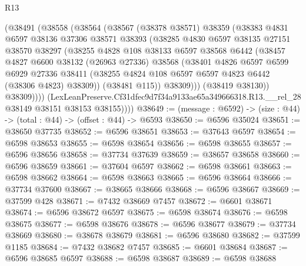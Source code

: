 \begin{lexlean}{R13}
\begin{coremodule}
            (@38491
              (@38558
                (@38564
                  (@38567
                    (@38378 @38571)
                    @38359
                    (@38383
                      @4831
                      @6597
                      @38136
                      @37306
                      @38571
                      @38393
                      (@38285
                        @4830
                        @6597
                        @38135
                        @27151
                        @38570
                        @38297
                        (@38255
                          @4828
                          @108
                          @38133
                          @6597
                          @38568
                          @6442
                          (@38457
                            @4827
                            @6600
                            @38132
                            (@26963 @27336)
                            @38568
                            (@38401
                              @4826
                              @6597
                              @6599
                              @6929
                              @27336
                              @38411
                              (@38255 @4824 @108 @6597 @6597 @4823 @6442 (@38306 @4823) @38309))
                            (@38481 @115))
                          @38309)))
                    (@38419 @38130))
                  @38309))))
          (LexLeanPreserve.Cf31dfec9d7f34a9133ae65a349666318.R13.__rel_28
            @38149
            @38151
            @38153
            @38155))))
@38649 := (message : @6592) -> (size : @44) -> (total : @44) -> (offset : @44) -> @6593
@38650 := @6596 @35024
@38651 := @38650 @37735
@38652 := @6596 @38651
@38653 := @37643 @6597
@38654 := @6598 @38653
@38655 := @6598 @38654
@38656 := @6598 @38655
@38657 := @6596 @38656
@38658 := @37734 @37639
@38659 := @38657 @38658
@38660 := @6596 @38659
@38661 := @37604 @6597
@38662 := @6598 @38661
@38663 := @6598 @38662
@38664 := @6598 @38663
@38665 := @6596 @38664
@38666 := @37734 @37600
@38667 := @38665 @38666
@38668 := @6596 @38667
@38669 := @37599 @428
@38671 := @7432 @38669 @7457
@38672 := @6601 @38671
@38674 := @6596 @38672 @6597
@38675 := @6598 @38674
@38676 := @6598 @38675
@38677 := @6598 @38676
@38678 := @6596 @38677
@38679 := @37734 @38669
@38680 := @38678 @38679
@38681 := @6596 @38680
@38682 := @37599 @1185
@38684 := @7432 @38682 @7457
@38685 := @6601 @38684
@38687 := @6596 @38685 @6597
@38688 := @6598 @38687
@38689 := @6598 @38688

\end{coremodule}
\end{lexlean}
